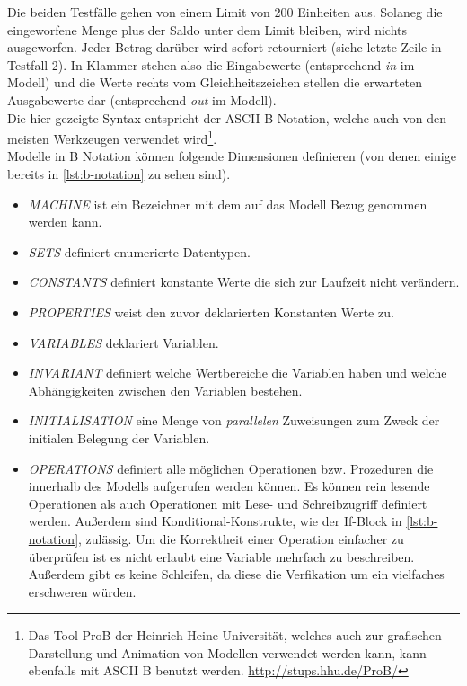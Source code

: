 Die beiden Testfälle gehen von einem Limit von 200 Einheiten aus. Solaneg die eingeworfene Menge plus der Saldo unter dem Limit bleiben, wird nichts ausgeworfen. Jeder Betrag darüber wird sofort retourniert (siehe letzte Zeile in Testfall 2). In Klammer stehen also die Eingabewerte (entsprechend \textit{in} im Modell) und die Werte rechts vom Gleichheitszeichen stellen die erwarteten Ausgabewerte dar (entsprechend \textit{out} im Modell).\\
Die hier gezeigte Syntax entspricht der ASCII B Notation, welche auch von den meisten Werkzeugen verwendet wird\footnote{Das Tool ProB der Heinrich-Heine-Universität, welches auch zur grafischen Darstellung und Animation von Modellen verwendet werden kann, kann ebenfalls mit ASCII B benutzt werden. \url{http://stups.hhu.de/ProB/}}.\\

Modelle in B Notation können folgende Dimensionen definieren (von denen einige bereits in \ref{lst:b-notation} zu sehen sind).

\begin{itemize}
\item \textit{MACHINE} ist ein Bezeichner mit dem auf das Modell Bezug genommen werden kann.
\item \textit{SETS} definiert enumerierte Datentypen.
\item \textit{CONSTANTS} definiert konstante Werte die sich zur Laufzeit nicht verändern.
\item \textit{PROPERTIES} weist den zuvor deklarierten Konstanten Werte zu.
\item \textit{VARIABLES} deklariert Variablen.
\item \textit{INVARIANT} definiert welche Wertbereiche die Variablen haben und welche Abhängigkeiten zwischen den Variablen bestehen.
\item \textit{INITIALISATION} eine Menge von \textit{parallelen} Zuweisungen zum Zweck der initialen Belegung der Variablen.
\item \textit{OPERATIONS} definiert alle möglichen Operationen bzw. Prozeduren die innerhalb des Modells aufgerufen werden können. Es können rein lesende Operationen als auch Operationen mit Lese- und Schreibzugriff definiert werden. Außerdem sind Konditional-Konstrukte, wie der If-Block in \ref{lst:b-notation}, zulässig. Um die Korrektheit einer Operation einfacher zu überprüfen ist es nicht erlaubt eine Variable mehrfach zu beschreiben. Außerdem gibt es keine Schleifen, da diese die Verfikation um ein vielfaches erschweren würden.
\end{itemize}
